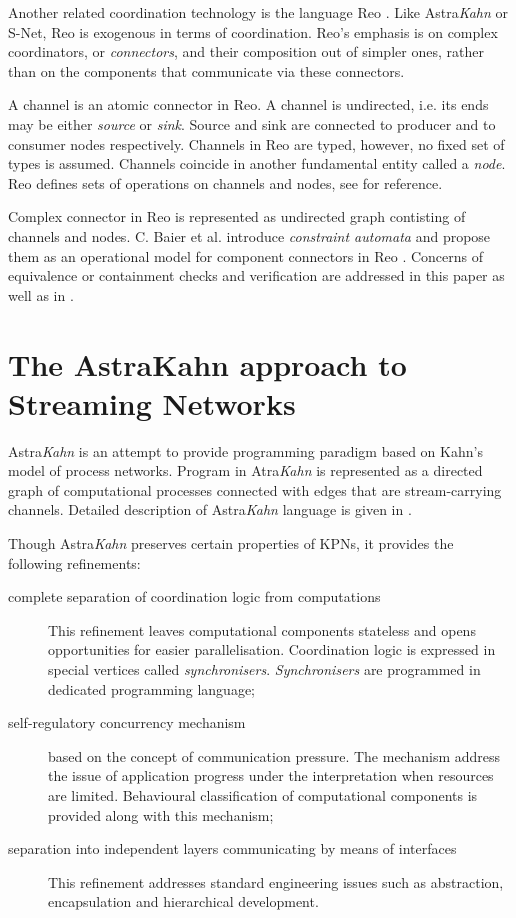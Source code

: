 \documentclass{article}
\begin{document}
Another related coordination technology is the language Reo \cite{Reo_Arbab04}. Like Astra\emph{Kahn} or S-Net, Reo is exogenous in terms of coordination. Reo's emphasis is on complex coordinators, or \emph{connectors}, and their composition out of simpler ones, rather than on the components that communicate via these connectors.

A channel is an atomic connector in Reo. A channel is undirected, i.e. its ends may be either \emph{source} or \emph{sink}. Source and sink are connected to producer and to consumer nodes respectively. Channels in Reo are typed, however, no fixed set of types is assumed. Channels coincide in another fundamental entity called a \emph{node}. Reo defines sets of operations on channels and nodes, see \cite{Reo_Arbab04} for reference.

Complex connector in Reo is represented as undirected graph contisting of channels and nodes. C. Baier et al. introduce \emph{constraint automata} and propose them as an operational model for component connectors in Reo \cite{baier_ca}. Concerns of equivalence or containment checks and verification are addressed in this paper as well as in \cite{Pourvatan}.

\section{The AstraKahn approach to Streaming Networks}

Astra\emph{Kahn} is an attempt to provide programming paradigm based on Kahn's model of process networks. Program in Atra\emph{Kahn} is represented as a directed graph of computational processes connected with edges that are stream-carrying channels. Detailed description of Astra\emph{Kahn} language is given in \cite{astrakahn}.

Though Astra\emph{Kahn} preserves certain properties of KPNs, it provides the following refinements:
\begin{description}
\item[complete separation of coordination logic from computations]

This refinement leaves computational components stateless and opens opportunities for easier parallelisation. Coordination logic is expressed in special vertices called \emph{synchronisers}. \emph{Synchronisers} are programmed in dedicated programming language;
\item[self-regulatory concurrency mechanism] based on the concept of communication pressure. The mechanism address the issue of application progress under the interpretation when resources are limited. Behavioural classification of computational components is provided along with this mechanism;
\item[separation into independent layers communicating by means of interfaces]

This refinement addresses standard engineering issues such as abstraction, encapsulation and hierarchical development.
\end{description}
\end{document}
